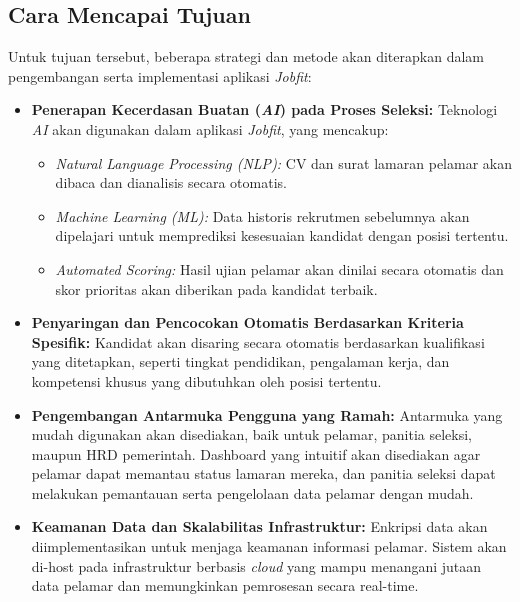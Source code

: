\documentclass[journal,article,submit,pdftex,moreauthors]{Definitions/mdpi}
\begin{document}
\subsection{Cara Mencapai Tujuan}
Untuk tujuan tersebut, beberapa strategi dan metode akan diterapkan dalam pengembangan serta implementasi aplikasi \textit{Jobfit}:
\begin{itemize}[left=2em]
    \item \textbf{Penerapan Kecerdasan Buatan (\textit{AI}) pada Proses Seleksi:} Teknologi \textit{AI} akan digunakan dalam aplikasi \textit{Jobfit}, yang mencakup:
    \begin{itemize}[left=2em]
        \item \textit{Natural Language Processing (\textit{NLP}):} CV dan surat lamaran pelamar akan dibaca dan dianalisis secara otomatis.
        \item \textit{Machine Learning (\textit{ML}):} Data historis rekrutmen sebelumnya akan dipelajari untuk memprediksi kesesuaian kandidat dengan posisi tertentu.
        \item \textit{Automated Scoring:} Hasil ujian pelamar akan dinilai secara otomatis dan skor prioritas akan diberikan pada kandidat terbaik.
    \end{itemize}
    \item \textbf{Penyaringan dan Pencocokan Otomatis Berdasarkan Kriteria Spesifik:} Kandidat akan disaring secara otomatis berdasarkan kualifikasi yang ditetapkan, seperti tingkat pendidikan, pengalaman kerja, dan kompetensi khusus yang dibutuhkan oleh posisi tertentu.
    \item \textbf{Pengembangan Antarmuka Pengguna yang Ramah:} Antarmuka yang mudah digunakan akan disediakan, baik untuk pelamar, panitia seleksi, maupun HRD pemerintah. Dashboard yang intuitif akan disediakan agar pelamar dapat memantau status lamaran mereka, dan panitia seleksi dapat melakukan pemantauan serta pengelolaan data pelamar dengan mudah.
    \item \textbf{Keamanan Data dan Skalabilitas Infrastruktur:} Enkripsi data akan diimplementasikan untuk menjaga keamanan informasi pelamar. Sistem akan di-host pada infrastruktur berbasis \textit{cloud} yang mampu menangani jutaan data pelamar dan memungkinkan pemrosesan secara real-time.
\end{itemize}
\end{document}
